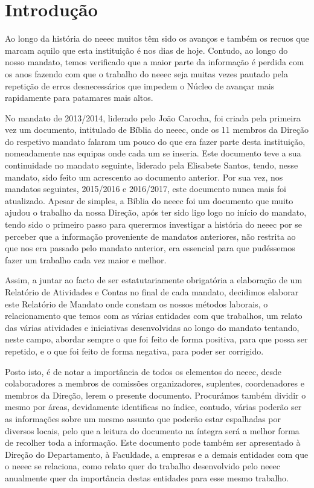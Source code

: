 
\section{Introdução}

Ao longo da história do \acrshort{neeec} muitos têm sido os avanços e também os recuos que marcam aquilo que esta instituição é nos dias de hoje. Contudo, ao longo do nosso mandato, temos verificado que a maior parte da informação é perdida com os anos fazendo com que o trabalho do \acrshort{neeec} seja muitas vezes pautado pela repetição de erros desnecessários que impedem o Núcleo de avançar mais rapidamente para patamares mais altos.

No mandato de 2013/2014, liderado pelo João Carocha, foi criada pela primeira vez um documento, intitulado de Bíblia do \acrshort{neeec}, onde os 11 membros da Direção do respetivo mandato falaram um pouco do que era fazer parte desta instituição, nomeadamente nas equipas onde cada um se inseria. Este documento teve a sua continuidade no mandato seguinte, liderado pela Elisabete Santos, tendo, nesse mandato, sido feito um acrescento ao documento anterior. Por sua vez, nos mandatos seguintes, 2015/2016 e 2016/2017, este documento nunca mais foi atualizado. Apesar de simples, a Bíblia do \acrshort{neeec} foi um documento que muito ajudou o trabalho da nossa Direção, após ter sido ligo logo no início do mandato, tendo sido o primeiro passo para querermos investigar a história do \acrshort{neeec} por se perceber que a informação proveniente de mandatos anteriores, não restrita ao que nos era passado pelo mandato anterior, era essencial para que pudéssemos fazer um trabalho cada vez maior e melhor.

Assim, a juntar ao facto de ser estatutariamente obrigatória a elaboração de um Relatório de Atividades e Contas no final de cada mandato, decidimos elaborar este Relatório de Mandato onde constam os nossos métodos laborais, o relacionamento que temos com as várias entidades com que trabalhos, um relato das várias atividades e iniciativas desenvolvidas ao longo do mandato tentando, neste campo, abordar sempre o que foi feito de forma positiva, para que possa ser repetido, e o que foi feito de forma negativa, para poder ser corrigido.

Posto isto, é de notar a importância de todos os elementos do \acrshort{neeec}, desde colaboradores a membros de comissões organizadores, suplentes, coordenadores e membros da Direção, lerem o presente documento. Procurámos também dividir o mesmo por áreas, devidamente identificas no índice, contudo, várias poderão ser as informações sobre um mesmo assunto que poderão estar espalhadas por diversos locais, pelo que a leitura do documento na íntegra será a melhor forma de recolher toda a informação. Este documento pode também ser apresentado à Direção do Departamento, à Faculdade, a empresas e a demais entidades com que o \acrshort{neeec} se relaciona, como relato quer do trabalho desenvolvido pelo \acrshort{neeec} anualmente quer da importância destas entidades para esse mesmo trabalho. 

